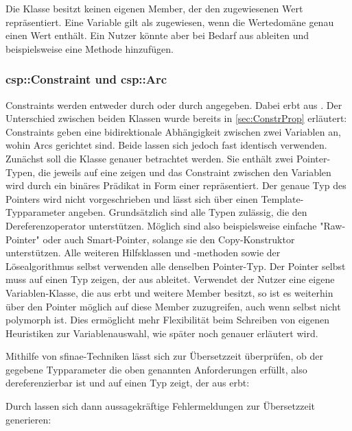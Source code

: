 Die Klasse  besitzt keinen eigenen Member, der den zugewiesenen Wert repräsentiert. Eine Variable gilt als zugewiesen, wenn die Wertedomäne genau einen
Wert enthält. Ein Nutzer könnte aber bei Bedarf aus  ableiten und beispielsweise eine Methode  hinzufügen.

\subsubsection{csp::Constraint und csp::Arc}
\label{sec:ArcConstr}
Constraints werden entweder durch  oder durch  angegeben. Dabei erbt  aus . Der Unterschied
zwischen beiden Klassen wurde bereits in \cref{sec:ConstrProp} erläutert: Constraints geben eine bidirektionale Abhängigkeit zwischen zwei Variablen an, wohin Arcs gerichtet sind.
Beide lassen sich jedoch fast identisch verwenden. Zunächst soll die Klasse  genauer betrachtet werden. Sie enthält zwei Pointer-Typen, die jeweils auf
eine  zeigen und das Constraint zwischen den Variablen wird durch ein binäres Prädikat in Form einer  repräsentiert. Der genaue Typ
des Pointers wird nicht vorgeschrieben und lässt sich über einen Template-Typparameter angeben. Grundsätzlich sind alle Typen zulässig, die den Dereferenzoperator \inlcode{*}
unterstützen. Möglich sind also beispielsweise einfache "Raw-Pointer" oder auch Smart-Pointer, solange sie den Copy-Konstruktor unterstützen. Alle weiteren Hilfsklassen und
-methoden sowie der Lösealgorithmus selbst verwenden alle denselben Pointer-Typ. Der Pointer selbst muss auf einen Typ zeigen, der aus  ableitet. Verwendet
der Nutzer eine eigene Variablen-Klasse, die aus  erbt und weitere Member besitzt, so ist es weiterhin über den Pointer möglich auf diese Member zuzugreifen,
auch wenn  selbst nicht polymorph ist. Dies ermöglicht mehr Flexibilität beim Schreiben von eigenen Heuristiken zur Variablenauswahl, wie später noch genauer
erläutert wird.

Mithilfe von \ac*{sfinae}-Techniken lässt sich zur Übersetzzeit überprüfen, ob der gegebene Typparameter die oben genannten Anforderungen erfüllt, also
dereferenzierbar ist und auf einen Typ zeigt, der aus  erbt:

Durch  lassen sich dann aussagekräftige Fehlermeldungen zur Übersetzzeit generieren:


